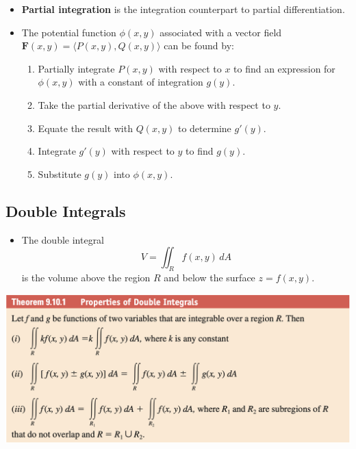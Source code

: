 \documentclass{article}
\begin{document}
\begin{itemize}
  \item \textbf{Partial integration} is the integration counterpart to partial differentiation.

  \item The potential function $\phi(x, y)$ associated with a vector field $\mathbf{F}(x, y) = \langle P(x, y), Q(x, y) \rangle$ can be found by:

        \begin{enumerate}
          \item Partially integrate $P(x, y)$ with respect to $x$ to find an expression for $\phi(x, y)$ with a constant of integration $g(y)$.

          \item Take the partial derivative of the above with respect to $y$.

          \item Equate the result with $Q(x, y)$ to determine $g'(y)$.

          \item Integrate $g'(y)$ with respect to $y$ to find $g(y)$.

          \item Substitute $g(y)$ into $\phi(x, y)$.
        \end{enumerate}
\end{itemize}

\subsection{Double Integrals}

\begin{itemize}
  \item The double integral \[V = \iint_R f(x, y) \,dA\] is the volume above the region $R$ and below the surface $z = f(x, y)$.
\end{itemize}

\includegraphics[scale=0.443]{properties-of-double-integrals}
\end{document}
